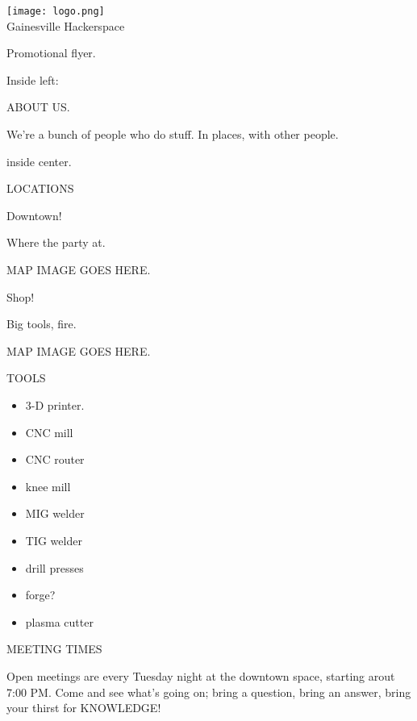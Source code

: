 \documentclass{leaflet}
\begin{document}
\begin{center} 
\texttt{[image: logo.png]} \\
\Large Gainesville Hackerspace
\normalsize
\end{center}

Promotional flyer.


\newpage

Inside left:

ABOUT US.

We're a bunch of people who do stuff.  In places, with other people.




\newpage

inside center.

LOCATIONS

\Large Downtown! 

\normalsize

Where the party at.


MAP IMAGE GOES HERE.



\Large Shop!

\normalsize

Big tools, fire.


MAP IMAGE GOES HERE.


\newpage


TOOLS

\begin{itemize}

\item 3-D printer.

\item CNC mill

\item CNC router

\item knee mill

\item MIG welder

\item TIG welder

\item drill presses

\item forge?

\item plasma cutter


\end{itemize}


\newpage


MEETING TIMES

Open meetings are every Tuesday night at the downtown space, starting
arout 7:00 PM.  Come and see what's going on; bring a question, bring
an answer, bring your thirst for KNOWLEDGE!
\end{document}
